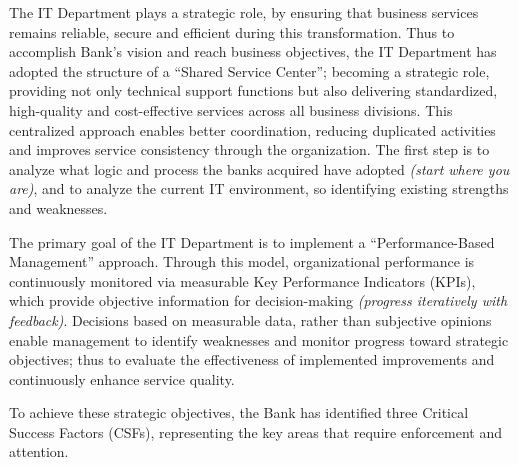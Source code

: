 The IT Department plays a strategic role, by ensuring that business services remains reliable, secure and efficient during this transformation. Thus to accomplish Bank's vision and reach business objectives, the IT Department has adopted the structure of a ``Shared Service Center''; becoming a strategic role, providing not only technical support functions but also delivering standardized, high-quality and cost-effective services across all business divisions.
This centralized approach enables better coordination, reducing duplicated activities and improves service consistency through the organization. The first step is to analyze what logic and process the banks acquired have adopted \textit{(start where you are)}, and to analyze the current IT environment, so identifying existing strengths and weaknesses.


The primary goal of the IT Department is to implement a ``Performance-Based Management'' approach. Through this model, organizational performance is continuously monitored via measurable Key Performance Indicators (KPIs), which provide objective information for decision-making \textit{(progress iteratively with feedback)}. Decisions based on measurable data, rather than subjective opinions enable management to identify weaknesses and monitor progress toward strategic objectives; thus to evaluate the effectiveness of implemented improvements and continuously enhance service quality.

To achieve these strategic objectives, the Bank has identified three Critical Success Factors (CSFs), representing the key areas that require enforcement and attention.

